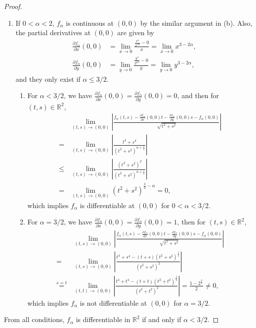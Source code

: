 \documentclass[11pt]{article}
\theoremstyle{definition}
\numberwithin{equation}{subsection}
\begin{document}
\begin{proof}
\begin{enumerate}[label=(\alph*)]
    \item If $0 < \alpha < 2$, $f_{\alpha}$ is continuous at $(0,0)$ by the similar argument in (b). Also, the partial derivatives at $(0,0)$ are given by
    \begin{align*}
        \frac{\partial f_{\alpha}}{\partial x}(0,0) & = \lim_{x\to 0} \frac{\frac{x^4}{x^{2\alpha}} - 0}{x} = \lim_{x\to 0} x^{3 - 2\alpha}, \\
        \frac{\partial f_{\alpha}}{\partial y}(0,0) & = \lim_{y\to 0} \frac{\frac{y^4}{y^{2\alpha}} - 0}{y} = \lim_{y\to 0} y^{3 - 2\alpha},
    \end{align*}
    and they only exist if $\alpha \leq 3/2$. 
    \begin{enumerate}[label=\arabic*)]
        \item For $\alpha < 3/2$, we have $\displaystyle \frac{\partial f_{\alpha}}{\partial x}(0,0) = \frac{\partial f_{\alpha}}{\partial y}(0,0) = 0$, and then for $(t,s) \in \mathbb{R}^2$, 
        \begin{align*}
            & \lim_{(t,s)\to (0,0)} \left| \frac{f_{\alpha}(t,s) - \frac{\partial f_{\alpha}}{\partial x}(0,0)t - \frac{\partial f_{\alpha}}{\partial y}(0,0)s - f_{\alpha}(0,0)}{\sqrt{t^2 + s^2}} \right| \\
            = & \lim_{(t,s)\to (0,0)} \left| \frac{t^4 + s^4}{(t^2 + s^2)^{\alpha + \frac{1}{2}}} \right| \\
            \leq & \lim_{(t,s)\to (0,0)} \left| \frac{(t^2 + s^2)^2}{(t^2 + s^2)^{\alpha + \frac{1}{2}}} \right| \\
            = & \lim_{(t,s)\to (0,0)} \left(t^2 + s^2\right)^{\frac{3}{2} - \alpha} = 0,
        \end{align*}
        which implies $f_{\alpha}$ is differentiable at $(0,0)$ for $0 < \alpha < 3/2$.
        
        \item For $\alpha = 3/2$, we have $\displaystyle \frac{\partial f_{\alpha}}{\partial x}(0,0) = \frac{\partial f_{\alpha}}{\partial y}(0,0) = 1$, then for $(t,s) \in \mathbb{R}^2$,
        \begin{align*}
            & \lim_{(t,s)\to (0,0)} \left| \frac{f_{\alpha}(t,s) - \frac{\partial f_{\alpha}}{\partial x}(0,0)t - \frac{\partial f_{\alpha}}{\partial y}(0,0)s - f_{\alpha}(0,0)}{\sqrt{t^2 + s^2}} \right| \\
            = & \lim_{(t,s)\to (0,0)} \left| \frac{t^4 + s^4 - (t+s)(t^2+s^2)^{\frac{3}{2}}}{(t^2+s^2)^2} \right| \\
            \overset{s = t}{=} & \lim_{(t,t)\to (0,0)} \left| \frac{t^4 + t^4 - (t+t)(t^2 + t^2)^{ \frac{3}{2}} }{(t^2 + t^2)^2} \right| = \frac{1 - 2^{\frac{3}{2}}}{2} \neq 0,
        \end{align*}
        which implies $f_{\alpha}$ is not differentiable at $(0,0)$ for $\alpha = 3/2$.
    \end{enumerate}
\end{enumerate}
From all conditions, $f_{\alpha}$ is differentiable in $\mathbb{R}^2$ if and only if $\alpha < 3/2$.
\end{proof}
\end{document}
